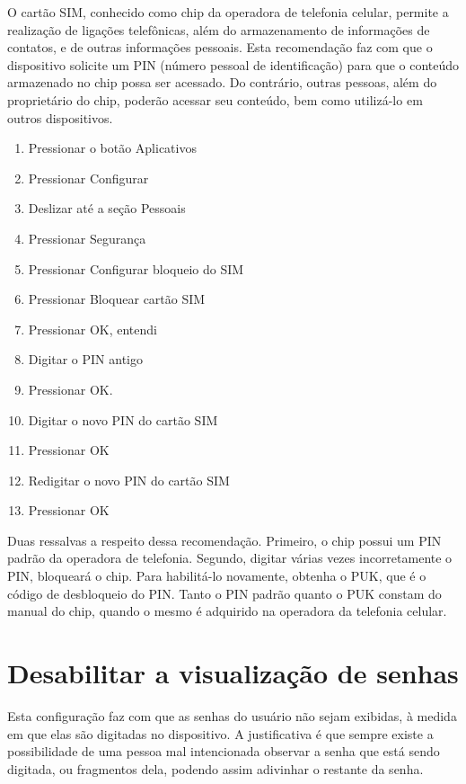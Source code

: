 O cart\~ao SIM, conhecido como chip da operadora de telefonia celular, permite a realiza\c c\~ao de liga\c c\~oes telef\^onicas, al\'em do armazenamento de informa\c c\~oes de contatos, e de outras informa\c c\~oes pessoais. Esta recomenda\c c\~ao faz com que o dispositivo solicite um PIN (n\'umero pessoal de identifica\c c\~ao) para que o conte\'udo armazenado no chip possa ser acessado. Do contr\'ario, outras pessoas, al\'em do propriet\'ario do chip, poder\~ao acessar seu conte\'udo, bem como utiliz\'a-lo em outros dispositivos.

\begin{enumerate}
\item Pressionar o bot\~ao Aplicativos
\item Pressionar Configurar
\item Deslizar at\'e a se\c c\~ao Pessoais
\item Pressionar Seguran\c ca
\item Pressionar Configurar bloqueio do SIM
\item Pressionar Bloquear cart\~ao SIM
\item Pressionar OK, entendi
\item Digitar o PIN antigo
\item Pressionar OK.
\item Digitar o novo PIN do cart\~ao SIM
\item Pressionar OK
\item Redigitar o novo PIN do cart\~ao SIM
\item Pressionar OK
\end{enumerate}

Duas ressalvas a respeito dessa recomenda\c c\~ao. Primeiro, o chip possui um PIN padr\~ao da operadora de telefonia. Segundo, digitar v\'arias vezes incorretamente o PIN, bloquear\'a o chip. Para habilit\'a-lo novamente, obtenha o PUK, que \'e o c\'odigo de desbloqueio do PIN. Tanto o PIN padr\~ao quanto o PUK constam do manual do chip, quando o mesmo \'e adquirido na operadora da telefonia celular.

\section{Desabilitar a visualiza\c c\~ao de senhas}

Esta configura\c c\~ao faz com que as senhas do usu\'ario n\~ao sejam exibidas, \`a medida em que elas s\~ao digitadas no dispositivo. A justificativa \' e que sempre existe a possibilidade de uma pessoa mal intencionada observar a senha que est\'a sendo digitada, ou fragmentos dela, podendo assim adivinhar o restante da senha.

